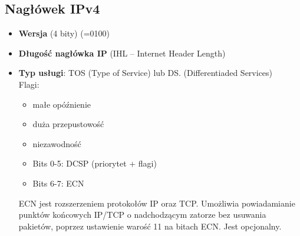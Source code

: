 \documentclass[../main.tex]{subfiles}
\begin{document}
    \subsection{Nagłówek IPv4}
    \begin{itemize}
        \item \textbf{Wersja} (4 bity) (=0100)
        \item \textbf{Długość nagłówka IP} (IHL – Internet Header Length)
        \item \textbf{Typ usługi}: TOS (Type of Service) lub DS. (Differentiaded Services)\\
        Flagi:
        \begin{itemize}
            \item małe opóźnienie
            \item duża przepustowość
            \item niezawodność
        \end{itemize}
        \begin{itemize}
            \item Bits 0-5: DCSP (priorytet + flagi)
            \item Bits 6-7: ECN
        \end{itemize}
        ECN jest rozszerzeniem protokołów IP oraz TCP. Umożliwia powiadamianie punktów końcowych IP/TCP o nadchodzącym zatorze bez usuwania pakietów, poprzez ustawienie warość 11 na bitach ECN. Jest opcjonalny.


\end{itemize}
\end{document}
